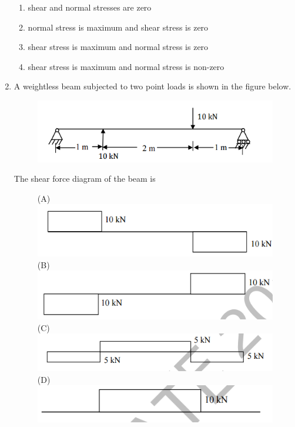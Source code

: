 \documentclass[a4paper,10pt]{article}
\begin{document}
\begin{enumerate}
    \hfill{}
    \begin{enumerate}
        \item shear and normal stresses are zero
        \item normal stress is maximum and shear stress is zero
        \item shear stress is maximum and normal stress is zero
        \item shear stress is maximum and normal stress is non-zero
    \end{enumerate}

    \item A weightless beam subjected to two point loads is shown in the figure below.
    \begin{figure}[H] \centering \includegraphics[width=0.6\columnwidth]{q5_solid.png} \caption*{} \label{fig:q5_solid} \end{figure}
    The shear force diagram of the beam is
    
    \hfill{}
    \begin{figure}[H] \centering \caption*{} \label{fig:q5_solid_options}
        (A) \includegraphics[width=0.5\columnwidth]{q5a_solid.png} \\
        (B) \includegraphics[width=0.5\columnwidth]{q5b_solid.png} \\
        (C) \includegraphics[width=0.5\columnwidth]{q5c_solid.png} \\
        (D) \includegraphics[width=0.5\columnwidth]{q5d_solid.png}
    \end{figure}
    

\end{enumerate}
\end{document}

